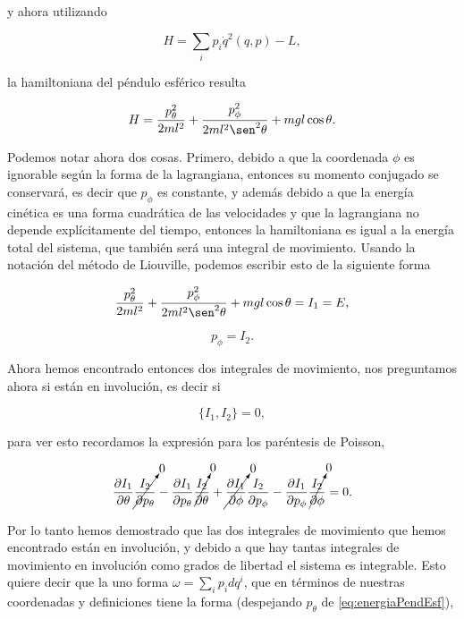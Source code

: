 \documentclass[a4paper,10pt]{article}
\numberwithin{equation}{section}
\begin{document}
y ahora utilizando 

\begin{equation}
 H = \sum_i p_i \dot{q}^2(q,p) - L, 
\end{equation}

la hamiltoniana del péndulo esférico resulta

\begin{equation}
 H = \frac{p_\theta^2}{2ml^2} + \frac{p_\phi^2}{2ml^2\sen^2{\theta}} 
 + mgl\cos{\theta}.
\end{equation}

Podemos notar ahora dos cosas. Primero, debido a que la coordenada $\phi$ es 
ignorable según la forma de la lagrangiana, entonces su momento conjugado se 
conservará, es decir que $p_\phi$ es constante, y además debido a que la energía 
cinética es una forma cuadrática de las velocidades y que la lagrangiana no depende 
explícitamente del tiempo, entonces la hamiltoniana es igual a la energía total 
del sistema, que también será una integral de movimiento. Usando la notación del
método de Liouville, podemos escribir esto de la siguiente forma 

\begin{equation}
  \frac{p_\theta^2}{2ml^2} + \frac{p_\phi^2}{2ml^2\sen^2{\theta}} 
 + mgl\cos{\theta} = I_1 = E,
 \label{eq:energiaPendEsf}
\end{equation}

\begin{equation}
 p_\phi = I_2.
 \label{eq:pphiPendEsf}
\end{equation}

Ahora hemos encontrado entonces dos integrales de movimiento, nos preguntamos ahora 
si están en involución, es decir si 

\begin{equation}
 \{I_1, I_2\} = 0,
\end{equation}

para ver esto recordamos la expresión para los paréntesis de Poisson, 

\begin{equation}
 \frac{\partial I_1}{\partial \theta}\cancelto{0}{\frac{I_2}{\partial p_\theta}} 
 - \frac{\partial I_1}{\partial p_\theta}\cancelto{0}{\frac{I_2}{\partial \theta}} + 
 \cancelto{0}{\frac{\partial I_1}{\partial \phi}}\frac{I_2}{\partial p_\phi} 
 - \frac{\partial I_1}{\partial p_\phi}\cancelto{0}{\frac{I_2}{\partial \phi}} = 
 0.
\end{equation}

Por lo tanto hemos demostrado que las dos integrales de movimiento que hemos encontrado 
están en involución, y debido a que hay tantas integrales de movimiento en involución como grados 
de libertad el sistema es integrable. Esto quiere decir que la uno forma $\omega = 
\sum_i p_idq^i$, que en términos de nuestras coordenadas y definiciones tiene la 
forma (despejando $p_\theta$ de \eqref{eq:energiaPendEsf}),
\end{document}
